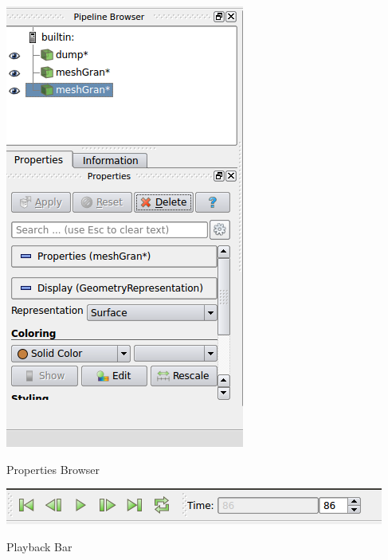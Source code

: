 \documentclass{tufte-book} %
\begin{document}
 \begin{marginfigure}
   \includegraphics[width=\linewidth]{graphics/Screenshot/P3.png}
   \caption{Properties Browser}
   \vspace{3ex}
 \end{marginfigure}
 \begin{marginfigure}
   \includegraphics[width=\linewidth]{graphics/Screenshot/P4.png}
   \caption{Playback Bar}
 \end{marginfigure}
\end{document}
